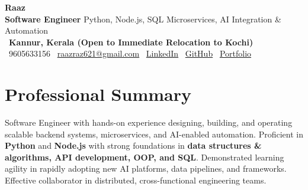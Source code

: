 \documentclass[a4paper,10pt]{article}
\newcommand{\faPhone}{}
\newcommand{\faEnvelope}{}
\newcommand{\faLinkedin}{}
\newcommand{\faGithub}{}
\newcommand{\faGlobe}{}
\newcommand{\faMapMarker}{}
\begin{document}
\begin{center}
{\LARGE \textbf{Raaz}} \\ \vspace{2pt}
{\small \textbf{Software Engineer} \textbar{} Python, Node.js, SQL \textbar{} Microservices, AI Integration \& Automation} \\ \vspace{2pt}
\small
\faMapMarker\ \textbf{Kannur, Kerala (Open to Immediate Relocation to Kochi)} \\ \vspace{2pt}
\faPhone\ 9605633156 \quad \textbar{} \quad
\faEnvelope\ \href{mailto:raazraz621@gmail.com}{raazraz621@gmail.com} \quad \textbar{} \quad
\faLinkedin\ \href{https://linkedin.com/in/raaz-ch-a77535277/}{LinkedIn} \quad \textbar{} \quad
\faGithub\ \href{https://github.com/gitmen321}{GitHub} \quad \textbar{} \quad
\faGlobe\ \href{https://raazportfolio.vercel.app/}{Portfolio}
\end{center}

\vspace{1pt}

\section{Professional Summary}
\noindent\small{Software Engineer with hands-on experience designing, building, and operating scalable backend systems, microservices, and AI-enabled automation. Proficient in \textbf{Python} and \textbf{Node.js} with strong foundations in \textbf{data structures \& algorithms, API development, OOP, and SQL}. Demonstrated learning agility in rapidly adopting new AI platforms, data pipelines, and frameworks. Effective collaborator in distributed, cross-functional engineering teams.}

\vspace{1pt}

\end{document}
